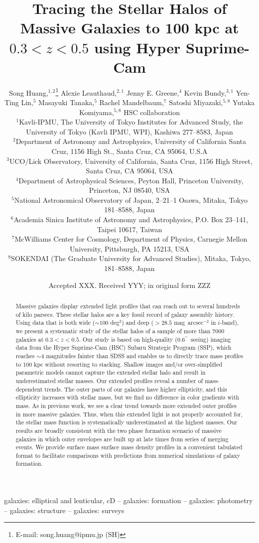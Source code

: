 \documentclass[a4paper,fleqn,usenatbib]{mnras}
\title[Mass Dependent Stellar Halo in Massive Galaxies]{Tracing the Stellar Halos of 
	   Massive Galaxies to 100 kpc at $0.3<z<0.5$ using Hyper Suprime-Cam}
\author[S. Huang et al.]{
        Song Huang,$^{1,2}$\thanks{E-mail: song.huang@ipmu.jp (SH)}
        Alexie Leauthaud,$^{2,1}$
        Jenny E. Greene,$^{4}$
        Kevin Bundy,$^{3,1}$
        \newauthor
        Yen-Ting Lin,$^{5}$
        Masayuki Tanaka,$^{5}$
        Rachel Mandelbaum,$^{7}$
        Satoshi Miyazaki,$^{5,8}$
        \newauthor
        Yutaka Komiyama,$^{5,8}$
        HSC collaboration 
        \\
        $^{1}$Kavli-IPMU, The University of Tokyo Institutes for Advanced Study, 
              the University of Tokyo (Kavli IPMU, WPI), Kashiwa 277--8583, Japan\\
        $^{2}$Department of Astronomy and Astrophysics, University of California 
              Santa Cruz, 1156 High St., Santa Cruz, CA 95064, U.S.A\\
        $^{3}$UCO/Lick Observatory, University of California, Santa Cruz,
              1156 High Street, Santa Cruz, CA 95064, USA\\
        $^{4}$Department of Astrophysical Sciences, Peyton Hall,
              Princeton University, Princeton, NJ 08540, USA \\
        $^{5}$National Astronomical Observatory of Japan, 2--21--1 Osawa, Mitaka, 
              Tokyo 181--8588, Japan\\
        $^{6}$Academia Sinica Institute of Astronomy and Astrophysics, 
              P.O. Box 23--141, Taipei 10617, Taiwan\\
        $^{7}$McWilliams Center for Cosmology, Department of Physics, 
              Carnegie Mellon University, Pittsburgh, PA 15213, USA\\
        $^{8}$SOKENDAI (The Graduate University for Advanced Studies), Mitaka,
              Tokyo, 181--8588, Japan
        }
\date{Accepted XXX. Received YYY; in original form ZZZ}
\def\asec{$^{\prime\prime}$}
\def\sb{mag~arcsec$^{-2}$}
\begin{document}
\label{firstpage}
\pagerange{\pageref{firstpage}--\pageref{lastpage}}

\maketitle


\begin{abstract} 

    Massive galaxies display extended light profiles that can reach out to several 
    hundreds of kilo parsecs. 
    These stellar halos are a key fossil record of galaxy assembly history. 
    Using data that is both wide (${\sim}100$ deg$^2$) and deep ($>28.5$ \sb{} in 
    $i$-band), we present a systematic study of the stellar halos of a sample of more 
    than $7000$ galaxies at $0.3 < z < 0.5$. 
    Our study is based on high-quality (0.6\asec\ seeing) imaging data from the Hyper 
    Suprime-Cam (HSC) Subaru Strategic Program (SSP), which reaches ${\sim}4$ magnitudes 
    fainter than SDSS and enables us to directly trace mass profiles to 100 kpc 
    without resorting to stacking. 
    Shallow images and/or over-simplified parametric models cannot capture the extended 
    stellar halo and result in underestimated stellar masses.
    Our extended profiles reveal a number of mass-dependent trends. 
    The outer parts of our galaxies have higher ellipticity, and this ellipticity increases 
    with stellar mass, but we find no difference in color gradients with mass. 
    As in previous work, we see a clear trend towards more extended outer profiles 
    in more massive galaxies. 
    Thus, when this extended light is not properly accounted for, the stellar mass 
    function is systematically underestimated at the highest masses.
    Our results are broadly consistent with the two phase formation scenario of massive 
    galaxies in which outer envelopes are built up at late times from series of merging
    events. 
    We provide surface mass surface mass density profiles in a convenient tabulated format 
    to facilitate comparisons with predictions from numerical simulations of 
    galaxy formation.
    
\end{abstract}

\begin{keywords}
    galaxies: elliptical and lenticular, cD --
    galaxies: formation --
    galaxies: photometry -- 
    galaxies: structure -- 
    galaxies: surveys
\end{keywords}
\end{document}

